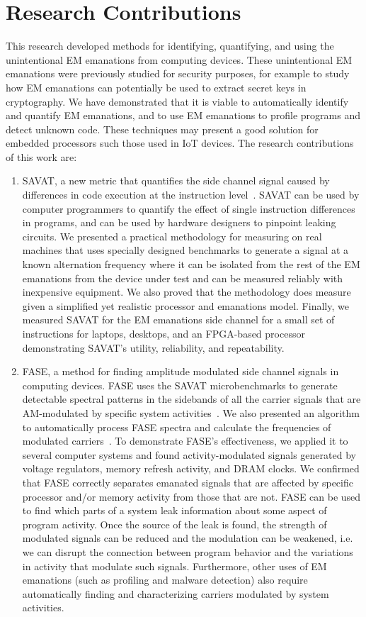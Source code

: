 \section{Research Contributions}
This research developed methods for identifying, quantifying, and using the unintentional EM emanations from computing devices. These unintentional EM emanations were previously studied for security purposes, for example to study how EM emanations can potentially be used to extract secret keys in cryptography. We have demonstrated that it is viable to automatically identify and quantify EM emanations, and to use EM emanations to profile programs and detect unknown code. These techniques may present a good solution for embedded processors such those used in IoT devices. The research contributions of this work are:
\begin{enumerate}
\item SAVAT, a new metric that quantifies the side channel signal caused by differences in code execution at the instruction level~\cite{CALLAN2014,Callan2015EMC,Callan2015}. SAVAT can be used by computer programmers to quantify the effect of single instruction differences in programs, and can be used by hardware designers to pinpoint leaking circuits. We presented a practical methodology for measuring \SAVAT on real machines that uses specially designed benchmarks to generate a signal at a known alternation frequency where it can be isolated from the rest of the EM emanations from the device under test and can be measured reliably with inexpensive equipment. We also proved that the methodology does measure \SAVAT given a simplified yet realistic processor and emanations model. Finally, we measured SAVAT for the EM emanations side channel for a small set of instructions for laptops, desktops, and an FPGA-based processor demonstrating SAVAT's utility, reliability, and repeatability.
\item FASE, a method for finding amplitude modulated side channel signals in computing devices. FASE uses the SAVAT microbenchmarks to generate detectable spectral patterns in the sidebands of all the carrier signals that are AM-modulated by specific system activities~\cite{FASE_2015}. We also presented an algorithm to automatically process FASE spectra and calculate the frequencies of modulated carriers~\cite{wang2016}. To demonstrate FASE's effectiveness, we applied it to several computer systems and found activity-modulated signals generated by voltage regulators, memory refresh activity, and DRAM clocks. We confirmed that FASE correctly separates emanated signals that are affected by specific processor and/or memory activity from those that are not. FASE can be used to find which parts of a system leak information about some aspect of program activity. Once the source of the leak is found, the strength of modulated signals can be reduced and the modulation can be weakened, i.e. we can disrupt the connection between program behavior and the variations in activity that modulate such signals. Furthermore, other uses of EM emanations (such as profiling and malware detection) also require automatically finding and characterizing carriers modulated by system activities. 

\end{enumerate}
